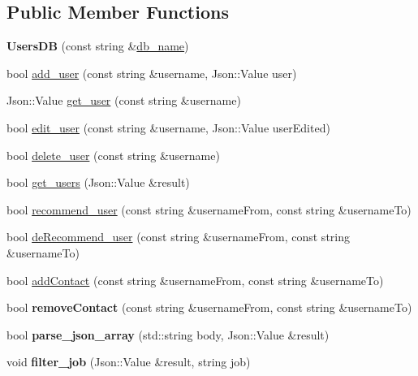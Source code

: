 \subsection*{Public Member Functions}
\begin{DoxyCompactItemize}
\item 
{\bfseries Users\+DB} (const string \&\hyperlink{classDB_a8c58fbd6650f3d5850adf699d1ee7ada}{db\+\_\+name})\hypertarget{classUsersDB_abb3ef18cb44cdf2d8ae4dcb7056bb3d6}{}\label{classUsersDB_abb3ef18cb44cdf2d8ae4dcb7056bb3d6}

\item 
bool \hyperlink{classUsersDB_aacd5108e72af7ebc19c047a55e9278ae}{add\+\_\+user} (const string \&username, Json\+::\+Value user)
\item 
Json\+::\+Value \hyperlink{classUsersDB_a8f6e2781a52b9ec07a00fd04bd1a050d}{get\+\_\+user} (const string \&username)
\item 
bool \hyperlink{classUsersDB_a76d79ef67fba93d13fa3378795dac8b4}{edit\+\_\+user} (const string \&username, Json\+::\+Value user\+Edited)
\item 
bool \hyperlink{classUsersDB_a969275d0174539c6d17051c440a96ddf}{delete\+\_\+user} (const string \&username)
\item 
bool \hyperlink{classUsersDB_aaf0cd0bd10d3f756c23ee67d7115ce27}{get\+\_\+users} (Json\+::\+Value \&result)
\item 
bool \hyperlink{classUsersDB_a5a3de6551b937b4d79e0fab4fe02cf44}{recommend\+\_\+user} (const string \&username\+From, const string \&username\+To)
\item 
bool \hyperlink{classUsersDB_a00d772e805dceebe3883220aebe830ae}{de\+Recommend\+\_\+user} (const string \&username\+From, const string \&username\+To)
\item 
bool \hyperlink{classUsersDB_a0e212f3cbf51473b794148a7bd65e8a4}{add\+Contact} (const string \&username\+From, const string \&username\+To)
\item 
bool {\bfseries remove\+Contact} (const string \&username\+From, const string \&username\+To)\hypertarget{classUsersDB_a06858ec780df685097994d2283f753b5}{}\label{classUsersDB_a06858ec780df685097994d2283f753b5}

\item 
bool {\bfseries parse\+\_\+json\+\_\+array} (std\+::string body, Json\+::\+Value \&result)\hypertarget{classUsersDB_a994e4d320d62b0fa0dd5a868bfa88c2f}{}\label{classUsersDB_a994e4d320d62b0fa0dd5a868bfa88c2f}

\item 
void {\bfseries filter\+\_\+job} (Json\+::\+Value \&result, string job)\hypertarget{classUsersDB_a14f1014b755c78452ec78acd393da0aa}{}\label{classUsersDB_a14f1014b755c78452ec78acd393da0aa}


\end{DoxyCompactItemize}

